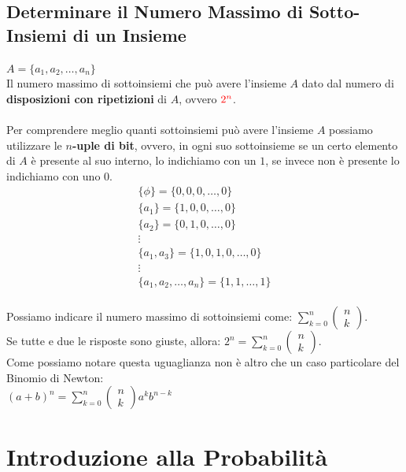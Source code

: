 \documentclass{article}
\begin{document}
\subsection{Determinare il Numero Massimo di Sotto-Insiemi di un Insieme}
$A = \{ a_1,a_2, \dots , a_n \}$ \\
Il numero massimo di sottoinsiemi che può avere l’insieme $A$ dato dal numero di \textbf{disposizioni con ripetizioni} di $A$, ovvero $\color{red} 2^n$. \\ \\
Per comprendere meglio quanti sottoinsiemi può avere l’insieme $A$ possiamo utilizzare le \textbf{$n$-uple di bit}, ovvero, in ogni suo sottoinsieme se un certo elemento di $A$ è presente al suo interno, lo indichiamo con un $1$, se invece non è presente lo indichiamo con uno $0$. \\
\[\begin{matrix}
\{ \phi \} = \{0, 0, 0, \dots , 0\} \\
\{ a_1 \} = \{1, 0, 0, \dots , 0\} \\
\{ a_2 \} = \{0, 1, 0, \dots , 0\} \\
\vdots \\
\{a_1 , a_3 \} = \{ 1, 0, 1, 0, \dots , 0\} \\
\vdots \\
\{a_1, a_2, \dots , a_n\} = \{1, 1, \dots, 1\}
\end{matrix}\] \\
Possiamo indicare il numero massimo di sottoinsiemi come: $\sum_{k = 0}^{n} \left( \begin{matrix} n \\ k\end{matrix} \right)$. \\
Se tutte e due le risposte sono giuste, allora: $2^n =\sum_{k = 0}^{n} \left( \begin{matrix} n \\ k\end{matrix} \right)$. \\
Come possiamo notare questa uguaglianza non è altro che un caso particolare del Binomio di Newton: \\ $(a+b)^n = \sum_{k = 0}^{n} \left( \begin{matrix} n \\ k\end{matrix} \right) a^kb^{n-k}$

\section{Introduzione alla Probabilità}
\end{document}
